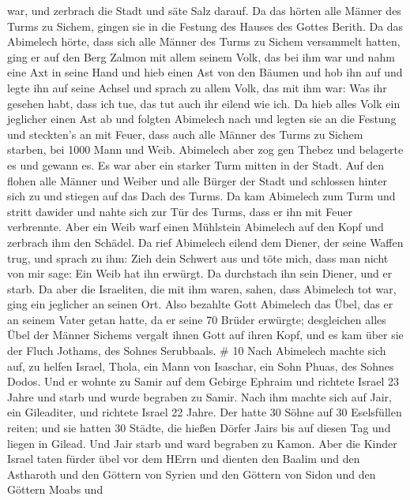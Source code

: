 war, und zerbrach die Stadt und säte Salz darauf.  Da das
hörten alle Männer des Turms zu Sichem, gingen sie in die Festung des
Hauses des Gottes Berith.  Da das Abimelech hörte, dass
sich alle Männer des Turms zu Sichem versammelt hatten, 
ging er auf den Berg Zalmon mit allem seinem Volk, das bei ihm war und
nahm eine Axt in seine Hand und hieb einen Ast von den Bäumen und hob
ihn auf und legte ihn auf seine Achsel und sprach zu allem Volk, das mit
ihm war: Was ihr gesehen habt, dass ich tue, das tut auch ihr eilend wie
ich.  Da hieb alles Volk ein jeglicher einen Ast ab und
folgten Abimelech nach und legten sie an die Festung und steckten's an
mit Feuer, dass auch alle Männer des Turms zu Sichem starben, bei 1000
Mann und Weib.  Abimelech aber zog gen Thebez und belagerte
es und gewann es.  Es war aber ein starker Turm mitten in
der Stadt. Auf den flohen alle Männer und Weiber und alle Bürger der
Stadt und schlossen hinter sich zu und stiegen auf das Dach des Turms.
 Da kam Abimelech zum Turm und stritt dawider und nahte
sich zur Tür des Turms, dass er ihn mit Feuer verbrennte. 
Aber ein Weib warf einen Mühlstein Abimelech auf den Kopf und zerbrach
ihm den Schädel.  Da rief Abimelech eilend dem Diener, der
seine Waffen trug, und sprach zu ihm: Zieh dein Schwert aus und töte
mich, dass man nicht von mir sage: Ein Weib hat ihn erwürgt. Da
durchstach ihn sein Diener, und er starb.  Da aber die
Israeliten, die mit ihm waren, sahen, dass Abimelech tot war, ging ein
jeglicher an seinen Ort.  Also bezahlte Gott Abimelech das
Übel, das er an seinem Vater getan hatte, da er seine 70 Brüder
erwürgte;  desgleichen alles Übel der Männer Sichems
vergalt ihnen Gott auf ihren Kopf, und es kam über sie der Fluch
Jothams, des Sohnes Serubbaals. \# 10  Nach Abimelech machte
sich auf, zu helfen Israel, Thola, ein Mann von Isaschar, ein Sohn
Phuas, des Sohnes Dodos. Und er wohnte zu Samir auf dem Gebirge Ephraim
 und richtete Israel 23 Jahre und starb und wurde begraben
zu Samir.  Nach ihm machte sich auf Jair, ein Gileaditer,
und richtete Israel 22 Jahre.  Der hatte 30 Söhne auf 30
Eselsfüllen reiten; und sie hatten 30 Städte, die hießen Dörfer Jairs
bis auf diesen Tag und liegen in Gilead.  Und Jair starb und
ward begraben zu Kamon.  Aber die Kinder Israel taten fürder
übel vor dem HErrn und dienten den Baalim und den Astharoth und den
Göttern von Syrien und den Göttern von Sidon und den Göttern Moabs und
